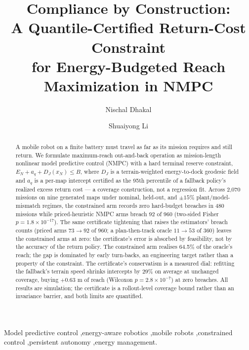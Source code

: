 \documentclass[preprint,12pt]{elsarticle}
\begin{document}
\begin{frontmatter}
\title{Compliance by Construction:\\ A Quantile-Certified Return-Cost Constraint\\ for Energy-Budgeted Reach Maximization in NMPC}
\author[1]{Nischal Dhakal}
\author[2]{Shuaiyong Li}
\begin{abstract}
A mobile robot on a finite battery must travel as far as its mission
requires and still return. We formulate maximum-reach out-and-back
operation as mission-length nonlinear model predictive control (NMPC)
with a hard terminal reserve constraint,
$E_N + a_q + D_J(x_N) \le B$, where $D_J$ is a terrain-weighted
energy-to-dock geodesic field and $a_q$ is a per-map intercept
certified as the 95th percentile of a fallback policy's realized excess
return cost --- a coverage construction, not a regression fit. Across
2{,}070 missions on nine generated maps under nominal, held-out, and
$\pm 15\%$ plant/model-mismatch regimes, the constrained arm records
zero hard-budget breaches in 480 missions while priced-heuristic NMPC
arms breach 92 of 960 (two-sided Fisher $p = 1.8\times10^{-17}$). The
same certificate tightening that raises the estimators' breach counts
(priced arms $73\to92$ of 960; a plan-then-track oracle
$11\to53$ of 360) leaves the constrained arms at zero: the
certificate's error is absorbed by feasibility, not by the accuracy of
the return policy. The constrained arm realises 64.5\% of the oracle's
reach; the gap is dominated by early turn-backs, an engineering target
rather than a property of the constraint. The certificate's
conservatism is a measured dial: refitting the fallback's terrain speed
shrinks intercepts by 29\% on average at unchanged coverage, buying
$+0.63$ m of reach (Wilcoxon $p = 2.8\times10^{-7}$) at zero breaches.
All results are simulation; the certificate is a rollout-level coverage
bound rather than an invariance barrier, and both limits are quantified.
\end{abstract}

\begin{keyword}
Model predictive control \sep energy-aware robotics \sep mobile robots \sep constrained control \sep persistent autonomy \sep energy management.
\end{keyword}

\end{frontmatter}
\end{document}
